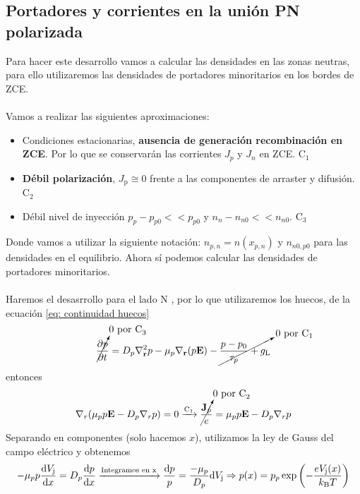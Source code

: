 \subsection{Portadores y corrientes en la unión PN polarizada}
Para hacer este desarrollo vamos a calcular las densidades en las zonas neutras, para ello utilizaremos las densidades de portadores minoritarios en los bordes de ZCE.\\\\
Vamos a realizar las siguientes aproximaciones:
\begin{itemize}
    \item Condiciones estacionarias, \textbf{ausencia de generación recombinación en ZCE}. Por lo que se conservarán las corrientes $J_p$ y $J_n$ en ZCE.   \hfill C$_1$
    \item \textbf{Débil polarización}, $J_\mathrm{p}\cong 0$ frente a las componentes de arraster y difusión.   \hfill C$_2$
    \item  Débil nivel de inyección $p_p-p_{p0}<<p_{p0}$ y $n_n-n_{n0}<<n_{n0}$.    \hfill C$_3$
\end{itemize}
Donde vamos a utilizar la siguiente notación: $n_{p,n}=n(x_{p,n})$ y $n_{n0,p0}$ para las densidades en el equilibrio.
Ahora sí podemos calcular las densidades de portadores minoritarios.\\\\ Haremos el desasrrollo para el lado N , por lo que utilizaremos los huecos, de la ecuación \ref{eq: continuidad huecos} 
\begin{equation*}
    \cancelto{0 \text{ por C}_3}{\pdiff[]{p}{t}}=D_p \nabla_\mathbf{r}^2 p- \mu_p \nabla_\mathbf{r} (p\mathbf{E})-\cancelto{0 \text{ por }\mathrm{C}_1}{\frac{p-p_0}{\tau_p}+g_\mathrm{L}}
\end{equation*}
entonces
\begin{equation*}
    \nabla_r(\mu_p p \mathbf{E}-D_p\nabla_r p)=0 \xrightarrow{\mathrm{C_1}}\cancelto{0\text{ por C}_2}{\frac{\mathbf{J}_p}{e}}=\mu_p p\mathbf{E}-D_p\nabla_r p
\end{equation*}
Separando en componentes (solo hacemos $x$), utilizamos la ley de Gauss del campo eléctrico y obtenemos
\begin{equation}
    -\mu_p p \diff[]{V_\mathrm{j}}{x}=D_p\diff[]{p}{x} \xrightarrow{\text{Integramos en x}} \frac{\mathrm{d}p}{p}=\frac{-\mu_p}{D_p} \mathrm{d}V_\mathrm{j} \Rightarrow p(x)=p_p \exp{\left ( -\frac{eV_\mathrm{j}(x)}{k_\mathrm{B}T} \right )}
    \label{eq: Densidad portadores minoritarios p}
\end{equation}
